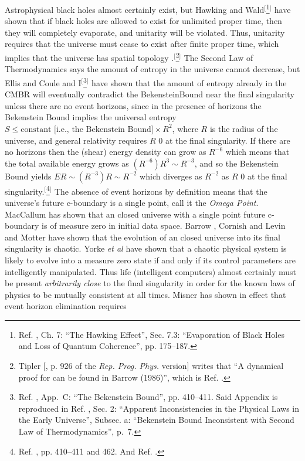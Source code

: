 \documentclass[letterpaper,12pt]{article}
\newenvironment{squote}
  {\small\quote}
  {\endquote\normalsize}
\begin{document}
\begin{squote}
Astrophysical black holes almost certainly exist, but Hawking \cite{Hawking1976} and Wald\( ^[ \)\footnote{Ref. , Ch. 7: ``The Hawking Effect'', Sec. 7.3: ``Evaporation of Black Holes and Loss of Quantum Coherence'', pp. 175--187.}\( ^] \) have shown that if black holes are allowed to exist for unlimited proper time, then they will completely evaporate, and \gls{unitarity} will be violated. Thus, unitarity requires that the universe must cease to exist after finite proper time, which implies that the universe has spatial topology .\( ^[ \)\footnote{Tipler [, p. 926 of the \emph{Rep. Prog. Phys.} version] writes that ``A dynamical proof for  can be found in Barrow (1986)'', which is Ref. .}\( ^] \) The Second Law of Thermodynamics says the amount of \gls{entropy} in the universe cannot decrease, but Ellis and Coule \cite{EllisCoule1994} and I\( ^[ \)\footnote{Ref. , App.~C: ``The Bekenstein Bound'', pp. 410--411. Said Appendix is reproduced in Ref. , Sec. 2: ``Apparent Inconsistencies in the Physical Laws in the Early Universe'', Subsec. a: ``Bekenstein Bound Inconsistent with Second Law of Thermodynamics'', p.~7.}\( ^] \) have shown that the amount of entropy already in the \gls{CMBR} will eventually contradict the \gls{BekensteinBound} near the final singularity unless there are no event horizons, since in the presence of horizons the Bekenstein Bound implies the universal entropy \( S \leq \text{constant [i.e., the Bekenstein Bound]} \times R^2 \), where \( R \) is the radius of the universe, and general relativity requires \( R \)  \( 0 \) at the final singularity. If there are no horizons then the (shear) energy density can grow as \( R^{-6} \) which means that the total available energy grows as \( (R^{-6})R^3 \sim R^{-3} \), and so the Bekenstein Bound yields \( ER \sim (R^{-3})R \sim R^{-2} \) which diverges as \( R^{-2} \) as \( R \)  \( 0 \) at the final singularity.\( ^[ \)\footnote{Ref. , pp. 410--411 and 462. And Ref.  .}\( ^] \) The absence of event horizons by definition means that the universe's future c-boundary is a single point, call it the \emph{Omega Point}. MacCallum \cite{MacCallum1971} has shown that an  closed universe with a single point future c-boundary is of measure zero in initial data space. Barrow \cite{Barrow1982,BarrowLevin1997}, Cornish and Levin \cite{CornisLevin1996} and Motter \cite{Motter2003} have shown that the evolution of an  closed universe into its final singularity is chaotic. Yorke \emph{et al} \cite{ShinbrotEtAl1990,ShinbrotEtAl1992} have shown that a chaotic physical system is likely to evolve into a measure zero state if and only if its control parameters are intelligently manipulated. Thus life (intelligent computers) almost certainly must be present \emph{arbitrarily close} to the final singularity in order for the known laws of physics to be mutually consistent at all times. Misner \cite{Misner1968,Misner1969-5,Misner1969-10} has shown in effect that event horizon elimination requires 
\end{squote}
\end{document}
